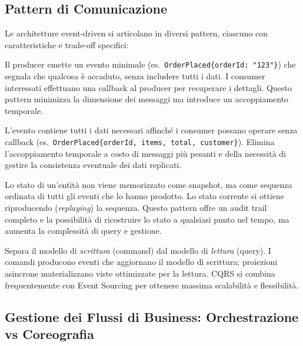 \documentclass[12pt,a4paper]{report}
\begin{document}
\subsection{Pattern di Comunicazione}

Le architetture event-driven si articolano in diversi pattern, ciascuno con
caratteristiche e trade-off specifici:

\begin{description}[style=nextline, leftmargin=1.5cm]
  \item[\textsf{Event Notification}]
    Il producer emette un evento minimale (es.\ \texttt{OrderPlaced\{orderId:
    "123"\}}) che segnala che qualcosa è accaduto, senza includere tutti i dati.
    I consumer interessati effettuano una callback al producer per recuperare i
    dettagli. Questo pattern minimizza la dimensione dei messaggi ma introduce
    un accoppiamento temporale.

  \item[\textsf{Event-Carried State Transfer}]
    L'evento contiene tutti i dati necessari affinché i consumer possano operare
    senza callback (es.\ \texttt{OrderPlaced\{orderId, items, total, customer\}}).
    Elimina l'accoppiamento temporale a costo di messaggi più pesanti e della
    necessità di gestire la consistenza eventuale dei dati replicati.

  \item[\textsf{Event Sourcing}]
    Lo stato di un'entità non viene memorizzato come snapshot, ma come sequenza
    ordinata di tutti gli eventi che lo hanno prodotto. Lo stato corrente si
    ottiene riproducendo (\textit{replaying}) la sequenza. Questo pattern offre
    un audit trail completo e la possibilità di ricostruire lo stato a qualsiasi
    punto nel tempo, ma aumenta la complessità di query e gestione.

  \item[\textsf{CQRS (Command Query Responsibility Segregation)}]
    Separa il modello di \textit{scrittura} (command) dal modello di
    \textit{lettura} (query). I comandi producono eventi che aggiornano il modello
    di scrittura; proiezioni asincrone materializzano viste ottimizzate per la
    lettura. CQRS si combina frequentemente con Event Sourcing per ottenere
    massima scalabilità e flessibilità.
\end{description}

\subsection{Gestione dei Flussi di Business: Orchestrazione vs Coreografia}
\end{document}
